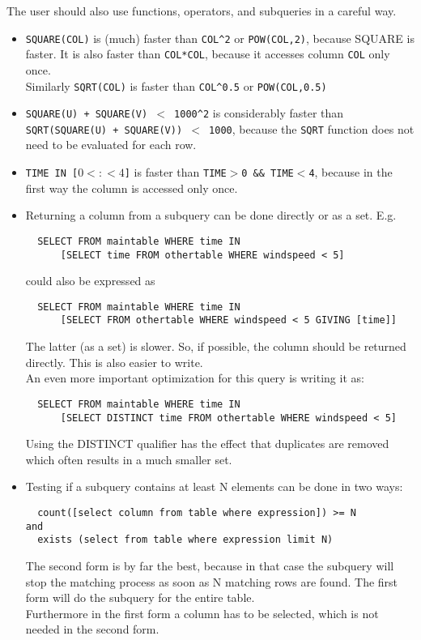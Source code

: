 The user should also use functions, operators, and subqueries in a careful way.
\begin{itemize}

\item
\texttt{SQUARE(COL)} is (much) faster than \texttt{COL}\verb+^+\texttt{2}
or \texttt{POW(COL,2)}, because SQUARE is faster.
It is also faster than \texttt{COL*COL}, because it accesses column
\texttt{COL} only once.
\\Similarly \texttt{SQRT(COL)} is faster than \texttt{COL}\verb+^+\texttt{0.5}
or \texttt{POW(COL,0.5)}

\item
\texttt{SQUARE(U) + SQUARE(V) $<$ 1000}\verb+^+\texttt{2} is considerably faster
than
\\\texttt{SQRT(SQUARE(U) + SQUARE(V)) $<$ 1000}, because the
\texttt{SQRT} function does not need to be evaluated for each row.

\item
\texttt{TIME IN [$0<:<4$]} is faster than
\texttt{TIME$>$0 \&\& TIME$<$4}, because in the first way the column is
accessed only once.

\item
Returning a column from a subquery can be done directly or as a
set. E.g.
\begin{verbatim}
  SELECT FROM maintable WHERE time IN
      [SELECT time FROM othertable WHERE windspeed < 5]
\end{verbatim}
could also be expressed as
\begin{verbatim}
  SELECT FROM maintable WHERE time IN
      [SELECT FROM othertable WHERE windspeed < 5 GIVING [time]]
\end{verbatim}
The latter (as a set) is slower. So, if possible, the column should
be returned directly. This is also easier to write.
\\An even more important optimization for this query is writing it as:
\begin{verbatim}
  SELECT FROM maintable WHERE time IN
      [SELECT DISTINCT time FROM othertable WHERE windspeed < 5]
\end{verbatim}
Using the DISTINCT qualifier has the effect that duplicates are
removed which often results in a much smaller set.

\item
Testing if a subquery contains at least N elements can be done in two
ways:
\begin{verbatim}
  count([select column from table where expression]) >= N
and
  exists (select from table where expression limit N)
\end{verbatim}
The second form is by far the best, because in that case the subquery
will stop the matching process as soon as N matching rows are found.
The first form will do the subquery for the entire table.
\\Furthermore in the first form a column has to be selected, which is
not needed in the second form.


\end{itemize}
